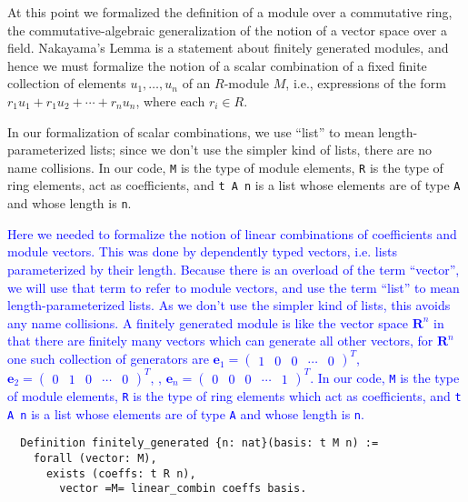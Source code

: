 \documentclass{article}
\begin{document}
At this point we formalized the definition of a module over a commutative ring, the  commutative-algebraic generalization of the notion of a vector
space over a field.  Nakayama's Lemma is a statement about finitely generated modules, and hence we must formalize the notion of a scalar combination of a fixed finite collection of elements $u_1, \ldots, u_n$ of an $R$-module $M$, i.e., expressions of the form  
$r_1 u_1 + r_1 u_2 + \cdots + r_n u_n$, where each $r_i \in R$.

In our formalization of scalar combinations, 
we use  ``list'' to mean length-parameterized lists; since we don't use the simpler
kind of lists, there are no name collisions.
In our code, \texttt{M} is the type of module elements, \texttt{R} is the type of ring
elements,  act as coefficients, and \texttt{t A n} is a list whose elements
are of type \texttt{A} and whose length is \texttt{n}.


\textcolor{blue}{Here we needed to formalize the notion of linear combinations of
coefficients and module vectors. This was done by dependently typed vectors,
i.e. lists parameterized by their length. Because there is an overload of the
term ``vector'', we will use that term to refer to module vectors, and use the
term ``list'' to mean length-parameterized lists. As we don't use the simpler
kind of lists, this avoids any name collisions. A finitely generated module is
like the vector space \(\mathbf{R}^{n}\) in that there are finitely many
vectors which can generate all other vectors, for \(\mathbf{R}^{n}\) one such
collection of generators are \(\mathbf{e}_{1} = \begin{pmatrix} 1 & 0 & 0 &
  \cdots & 0\end{pmatrix}^{T}\), \(\mathbf{e}_{2} = \begin{pmatrix} 0 & 1 & 0 &
  \cdots & 0\end{pmatrix}^{T}\), \textellipsis, \(\mathbf{e}_{n} =
  \begin{pmatrix} 0 & 0 & 0 & \cdots & 1\end{pmatrix}^{T}\). In our code,
\texttt{M} is the type of module elements, \texttt{R} is the type of ring
elements which act as coefficients, and \texttt{t A n} is a list whose elements
are of type \texttt{A} and whose length is \texttt{n}.
}

\begin{verbatim}
  Definition finitely_generated {n: nat}(basis: t M n) :=
    forall (vector: M),
      exists (coeffs: t R n),
        vector =M= linear_combin coeffs basis.
\end{verbatim}
\end{document}
